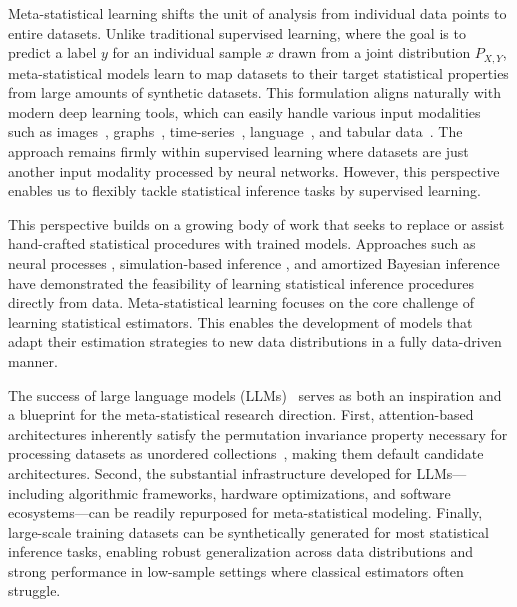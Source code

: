 Meta-statistical learning shifts the unit of analysis from individual data points to entire datasets. Unlike traditional supervised learning, where the goal is to predict a label \( y \) for an individual sample \( x \) drawn from a joint distribution \( P_{X,Y} \), meta-statistical models learn to map datasets to their target statistical properties from large amounts of synthetic datasets. This formulation aligns naturally with modern deep learning tools, which can easily handle various input modalities such as images~\cite{voulodimos2018deep}, graphs~\cite{ma2021deep}, time-series~\cite{gamboa2017deep,lim2021time,torres2021deep}, language~\cite{NIPS2017_3f5ee243,devlin-etal-2019-bert,radford2019language}, and tabular data~\cite{NEURIPS2023_90debc7c,hollmann2025accurate}. The approach remains firmly within supervised learning where datasets are just another input modality processed by neural networks. However, this perspective enables us to flexibly tackle statistical inference tasks by supervised learning.

This perspective builds on a growing body of work that seeks to replace or assist hand-crafted statistical procedures with trained models. Approaches such as neural processes \cite{garnelo2018neural, garnelo2018conditional, Gordon:2020, markou2022practical, huang2023practical, BruinsmaMRFAVBH23, chang2025amortized}, simulation-based inference \cite{pmlr-v89-papamakarios19a, cranmer2020frontier}, and amortized Bayesian inference \cite{chan2018likelihood, chen2023learning, chen2020neural, elsemueller2024sensitivity, radev2020bayesflow, avecilla2022neural, pmlr-v235-gloeckler24a} have demonstrated the feasibility of learning statistical inference procedures directly from data. Meta-statistical learning focuses on the core challenge of learning statistical estimators. This enables the development of models that adapt their estimation strategies to new data distributions in a fully data-driven manner.


The success of large language models (LLMs)~\cite{NIPS2017_3f5ee243,radford2019language,achiam2023gpt} serves as both an inspiration and a blueprint for the meta-statistical research direction. First, attention-based architectures inherently satisfy the permutation invariance property necessary for processing datasets as unordered collections~\cite{lee2019set,zhang2022set}, making them default candidate architectures. Second, the substantial infrastructure developed for LLMs—including algorithmic frameworks, hardware optimizations, and software ecosystems—can be readily repurposed for meta-statistical modeling. Finally, large-scale training datasets can be synthetically generated for most statistical inference tasks, enabling robust generalization across data distributions and strong performance in low-sample settings where classical estimators often struggle.

